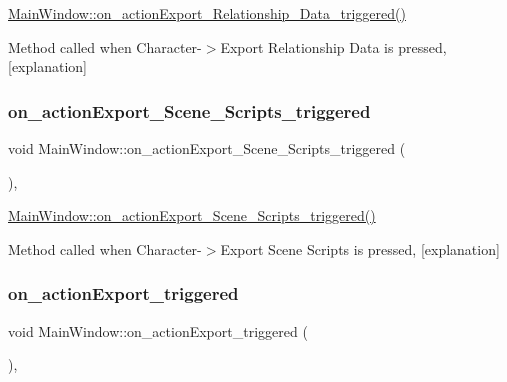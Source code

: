 \hyperlink{class_main_window_a3f75e84ed258d8b94b97c8043070f901}{Main\+Window\+::on\+\_\+action\+Export\+\_\+\+Relationship\+\_\+\+Data\+\_\+triggered()} 

Method called when Character-\/$>$Export Relationship Data is pressed, \mbox{[}explanation\mbox{]} \mbox{\label{class_main_window_ad0ea1db59606c556eff984ea8aaad198}} 
\subsubsection{\texorpdfstring{on\+\_\+action\+Export\+\_\+\+Scene\+\_\+\+Scripts\+\_\+triggered}{on\_actionExport\_Scene\_Scripts\_triggered}}
{\footnotesize\ttfamily void Main\+Window\+::on\+\_\+action\+Export\+\_\+\+Scene\+\_\+\+Scripts\+\_\+triggered (\begin{DoxyParamCaption}{ }\end{DoxyParamCaption})\hspace{0.3cm}{\ttfamily [private]}, {\ttfamily [slot]}}



\hyperlink{class_main_window_ad0ea1db59606c556eff984ea8aaad198}{Main\+Window\+::on\+\_\+action\+Export\+\_\+\+Scene\+\_\+\+Scripts\+\_\+triggered()} 

Method called when Character-\/$>$Export Scene Scripts is pressed, \mbox{[}explanation\mbox{]} \mbox{\label{class_main_window_a7df050ed9d3ca5f73a3ed852b35fc736}} 
\subsubsection{\texorpdfstring{on\+\_\+action\+Export\+\_\+triggered}{on\_actionExport\_triggered}}
{\footnotesize\ttfamily void Main\+Window\+::on\+\_\+action\+Export\+\_\+triggered (\begin{DoxyParamCaption}{ }\end{DoxyParamCaption})\hspace{0.3cm}{\ttfamily [private]}, {\ttfamily [slot]}}



